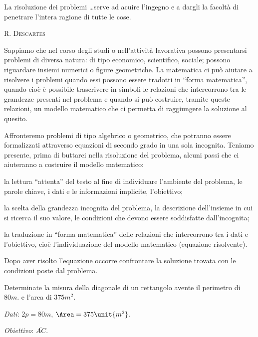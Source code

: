  \epigraph{La risoluzione dei problemi \ldots serve ad acuire l'ingegno e a 
dargli la facoltà di penetrare
 l'intera ragione di tutte le cose.}{{\scshape{R. Descartes}}}

Sappiamo che nel corso degli studi o nell'attività lavorativa possono 
presentarsi problemi di diversa natura: di tipo economico, scientifico, sociale; 
possono riguardare insiemi numerici o figure geometriche. La matematica ci può 
aiutare a risolvere i problemi quando essi possono essere tradotti in ``forma 
matematica'', quando cioè è possibile trascrivere in simboli le relazioni che 
intercorrono tra le grandezze presenti nel problema e quando si può costruire, 
tramite queste relazioni, un modello matematico che ci permetta di raggiungere 
la soluzione al quesito.

Affronteremo problemi di tipo algebrico o geometrico, che potranno essere 
formalizzati attraverso equazioni di secondo grado in una sola incognita.
Teniamo presente, prima di buttarci nella risoluzione del problema, alcuni passi 
che ci aiuteranno a costruire il modello matematico:
\begin{itemize*}
\item la lettura ``attenta'' del testo al fine di individuare l'ambiente del 
problema, le parole chiave, i dati e le informazioni implicite, l'obiettivo;
\item la scelta della grandezza incognita del problema, la descrizione 
dell'insieme in cui si ricerca il suo valore, le condizioni che devono essere 
soddisfatte dall'incognita;
\item la traduzione in ``forma matematica'' delle relazioni che intercorrono tra 
i dati e l'obiettivo, cioè l'individuazione del modello matematico (equazione 
risolvente).
\end{itemize*}
Dopo aver risolto l'equazione occorre confrontare la soluzione trovata con le 
condizioni poste dal problema.

\begin{problema}
Determinate la misura della diagonale di un rettangolo avente il perimetro di 
$80\unit{m}$. e l'area di $375\unit{m^2}$.
\end{problema}

\begin{center}
 
\end{center}

\emph{Dati}: $2 p = 80 \unit{m}$, $\Area = 375\unit{m^2}$.

\emph{Obiettivo}: $\overline {AC}$.


